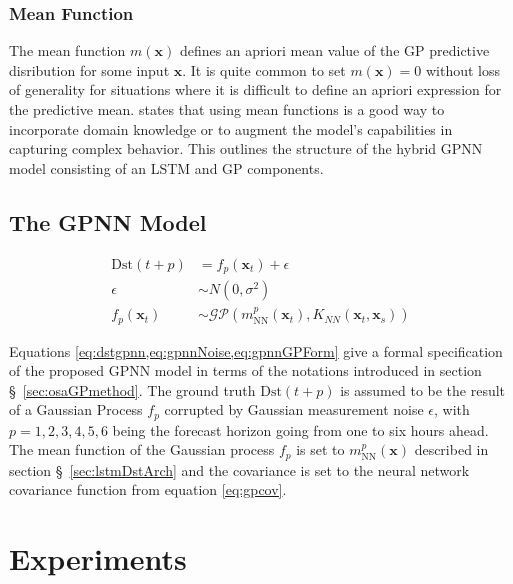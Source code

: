\subsubsection*{Mean Function}

The mean function $m \left( \mathbf{x} \right)$ defines an apriori mean value of the GP predictive disribution for 
some input $\mathbf{x}$. It is quite common to set $m(\mathbf{x}) = 0$ without loss of generality for situations where 
it is difficult to define an apriori expression for the predictive mean. 
\citet[ch.~2,sec.~2.7]{Rasmussen:2005:GPM:1162254} states that using mean functions is a good way to incorporate 
domain knowledge or to augment the model's capabilities in capturing complex behavior. This outlines the structure 
of the hybrid GPNN model consisting of an LSTM and GP components. 

\subsection{The GPNN Model}

\begin{align}
	\mathrm{Dst} \left( t+p \right) &= f_{p} \left( \mathbf{x}_{t} \right) + \epsilon \label{eq:dstgpnn}\\ 
	\epsilon &\sim N \left( 0, \sigma ^{2} \right)  \label{eq:gpnnNoise}\\
	f_{p} \left( \mathbf{x}_{t} \right)  &\sim 
	\mathcal{GP}\left(m^{p}_{\text{NN}}(\mathbf{x}_t), K_{NN}(\mathbf{x}_{t},\mathbf{x}_{s})\right)\label{eq:gpnnGPForm}
\end{align}
	

Equations \cref{eq:dstgpnn,eq:gpnnNoise,eq:gpnnGPForm} give a formal specification of the proposed GPNN model in 
terms of the notations introduced in section \S~\ref{sec:osaGPmethod}. The ground truth $\mathrm{Dst}\left(t + p\right)$ 
is assumed to be the result of a Gaussian Process $f_{p}$ corrupted by Gaussian measurement noise $\epsilon$, 
with $p = {1,2,3,4,5,6}$ being the forecast horizon going from one to six hours ahead. The mean function of the 
Gaussian process $f_{p}$ is set to $m^{p}_{\text{NN}} \left( \mathbf{x} \right)$ described in 
section \S~\ref{sec:lstmDstArch} and the covariance is set to the neural network covariance function 
from equation \ref{eq:gpcov}. 


\section{Experiments} \label{sec:resultsgpnn}

